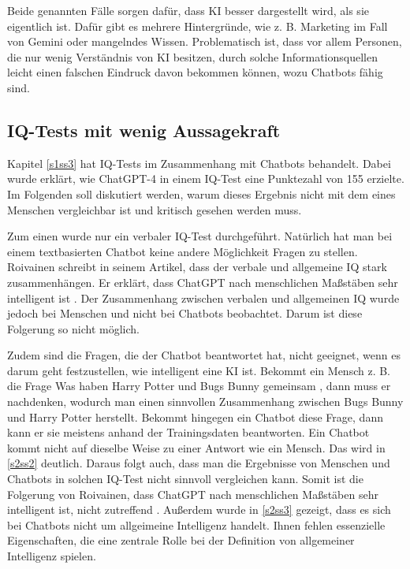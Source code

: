 	\clearpage
	\noindent
	Beide genannten Fälle sorgen dafür, dass KI besser dargestellt wird, als sie eigentlich
	ist. Dafür gibt es mehrere Hintergründe, wie z. B. Marketing im Fall von Gemini oder mangelndes
	Wissen. Problematisch ist, dass vor allem Personen, die nur wenig Verständnis von KI besitzen, durch 
	solche Informationsquellen leicht einen falschen Eindruck davon bekommen können, wozu Chatbots fähig sind.
	
	\clearpage
	\subsection{IQ-Tests mit wenig Aussagekraft}\label{s3ss3}
	Kapitel \ref{s1ss3} hat IQ-Tests im Zusammenhang mit Chatbots behandelt. Dabei wurde erklärt, wie ChatGPT-4 in einem
	IQ-Test eine Punktezahl von 155 erzielte. Im Folgenden soll diskutiert werden, warum dieses Ergebnis nicht mit dem
	eines Menschen vergleichbar ist und kritisch gesehen werden muss.
	
	Zum einen wurde nur ein verbaler IQ-Test durchgeführt. Natürlich hat man bei einem textbasierten Chatbot 
	keine andere Möglichkeit Fragen zu stellen. Roivainen schreibt in seinem Artikel, dass der verbale und allgemeine IQ
	stark zusammenhängen. Er erklärt, dass ChatGPT nach menschlichen Maßstäben sehr intelligent ist \cite{roivainen23}.
	Der Zusammenhang zwischen verbalen und allgemeinen IQ wurde jedoch bei Menschen und nicht bei Chatbots beobachtet. Darum
	ist diese Folgerung so nicht möglich.
	
	Zudem sind die Fragen, die der Chatbot beantwortet hat, nicht geeignet, wenn es darum geht festzustellen, wie intelligent eine KI ist.
	Bekommt ein Mensch z. B. die Frage \glqq{}Was haben Harry Potter und Bugs Bunny gemeinsam\grqq{} \cite{roivainen23},
	dann muss er nachdenken, wodurch man einen sinnvollen Zusammenhang zwischen Bugs Bunny und Harry Potter herstellt.
	Bekommt hingegen ein Chatbot diese Frage, dann kann er sie meistens anhand der Trainingsdaten beantworten. Ein Chatbot
	kommt nicht auf dieselbe Weise zu einer Antwort wie ein Mensch. Das wird in \ref{s2ss2} deutlich. Daraus folgt auch,
	dass man die Ergebnisse von Menschen und Chatbots in solchen IQ-Test nicht sinnvoll vergleichen kann. Somit ist die
	Folgerung von Roivainen, dass ChatGPT nach menschlichen Maßstäben sehr intelligent ist, nicht zutreffend \cite{roivainen23}. 
	Außerdem wurde in \ref{s2ss3} gezeigt, dass es sich bei Chatbots nicht um allgeimeine Intelligenz handelt. Ihnen fehlen essenzielle
	Eigenschaften, die eine zentrale Rolle bei der Definition von allgemeiner Intelligenz spielen. 	
	
